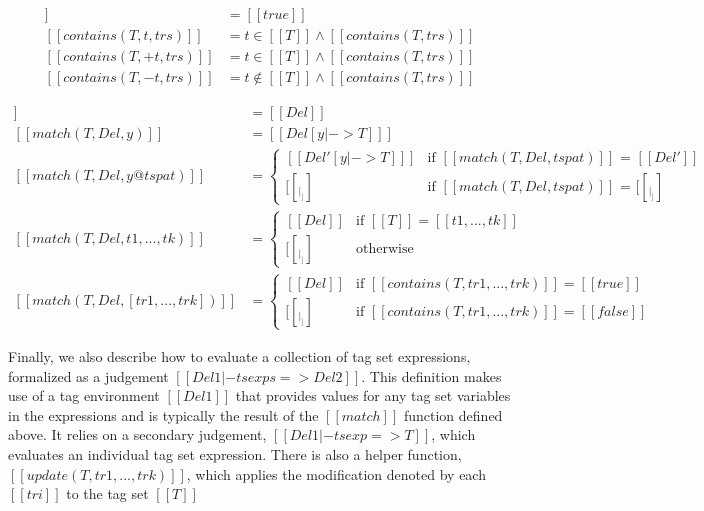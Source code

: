 \documentclass[12pt]{article}
\begin{document}
\bigskip
{}
\begin{align*}
  [[contains(T,.)]] &= [[true]]\\
  [[contains(T,t,trs)]] &= t \in [[T]] \wedge [[contains(T,trs)]]\\
  [[contains(T,+t,trs)]] &= t \in [[T]] \wedge [[contains(T,trs)]]\\
  [[contains(T,-t,trs)]] &= t \notin [[T]] \wedge [[contains(T,trs)]]
\end{align*}

\bigskip
{}

\begin{align*}
  [[match(T,Del,_)]] &= [[Del]]\\
  [[match(T,Del,y)]] &= [[Del [ y |-> T] ]]\\
  [[match(T,Del,y@tspat)]] &=
      \begin{cases}
        [[Del'[y |-> T] ]] & \text{if $[[match(T,Del,tspat)]]$ = $[[Del']]$}\\
        [[_|_]] & \text{if $[[match(T,Del,tspat)]]$ = $[[_|_]]$}
      \end{cases}
     \\
  [[match(T,Del,{t1,...,tk})]] &=
      \begin{cases}
        [[Del]] & \text{if } [[T]] = [[{t1,...,tk}]]\\
        [[_|_]] & \text{otherwise}
      \end{cases}
     \\
  [[match(T,Del,[tr1,...,trk])]] &=
      \begin{cases}
        [[Del]] & \text{if } [[contains(T,tr1,...,trk)]] = [[true]]\\
        [[_|_]] & \text{if } [[contains(T,tr1,...,trk)]] = [[false]]
      \end{cases}
\end{align*}

\ottdefnmsev

\bigskip

Finally, we also describe how to evaluate a collection of tag set expressions,
formalized as a judgement $[[Del1 |- tsexps => Del2]]$.  This definition makes
use of a tag environment $[[Del1]]$ that provides values for any tag set
variables in the expressions and is typically the result of the $[[match]]$
function defined above.  It relies on a secondary judgement,
$[[Del1 |- tsexp => T]]$, which evaluates an individual tag set expression.  There
is also a helper function, $[[update(T,tr1,...,trk)]]$, which applies the
modification denoted by each $[[tri]]$ to the tag set $[[T]]$
\end{document}
